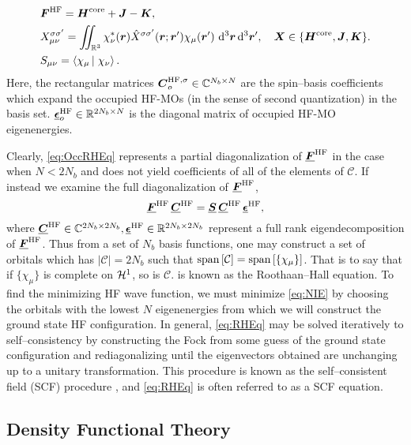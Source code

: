 \begin{subequations}
\begin{align}
  &\boldsymbol{F}^{\mathrm{HF}}=  \boldsymbol{H}^{\mathrm{core}} + \boldsymbol{J} - \boldsymbol{K}, \label{eq:HFMat}\\ 
&X_{\mu\nu}^{\sigma\sigma'} =  \int\mkern-12mu\int_{\mathbb R^3} \chi^*_\nu(\boldsymbol{r}) \hat{X}^{\sigma\sigma'}(\boldsymbol{r}; \boldsymbol{r}') \chi_\mu(\boldsymbol{r}')\,\,\mathrm{d}^3\boldsymbol{r}\,\mathrm{d}^3\boldsymbol{r}',
\quad \boldsymbol{X} \in \{ \boldsymbol{H}^{\mathrm{core}} , \boldsymbol{J} , \boldsymbol{K} \}. \label{eq:OBBasisExp}\\
&S_{\mu\nu} = \left\langle \chi_\mu \left\vert\right. \chi_\nu \right\rangle. 
\end{align}
\end{subequations}
Here, the rectangular matrices $\boldsymbol{C}_o^{\mathrm{HF},\sigma} \in \mathbb{C}^{N_b \times N}$
are the spin--basis coefficients which expand the occupied HF-MOs (in the sense
of second quantization) in the basis set. $\boldsymbol{\underline{\epsilon}}_o^{\mathrm{HF}} \in
\mathbb{R}^{2N_b \times N}$ is the diagonal matrix of occupied HF-MO eigenenergies. 

Clearly, \cref{eq:OccRHEq} represents a partial diagonalization of $\boldsymbol{\underline{F}}^{\mathrm{HF}}$ in the case when $N < 2N_b$ and does not
yield coefficients of all of the elements of $\mathcal{C}$. If instead we examine the full diagonalization of $\boldsymbol{\underline{F}}^{\mathrm{HF}}$,
\begin{equation}
\label{eq:RHEq}
\boldsymbol{\underline{F}}^{\mathrm{HF}} \,\boldsymbol{\underline{C}}^{\mathrm{HF}} = \boldsymbol{\underline{S}}\, \boldsymbol{\underline{C}}^{\mathrm{HF}}\, \boldsymbol{\underline{\epsilon}}^{\mathrm{HF}},
\end{equation}
where $\boldsymbol{\underline{C}}^{\mathrm{HF}} \in \mathbb{C}^{2N_b \times 2N_b}, \boldsymbol{\underline{\epsilon}}^{\mathrm{HF}} \in \mathbb{R}^{2N_b \times 2N_b}$ represent a full rank 
eigendecomposition of $\boldsymbol{\underline{F}}^{\mathrm{HF}}$. Thus from a set of $N_b$ basis functions, one may construct a set of orbitals
which has $\vert \mathcal{C} \vert = 2N_b$ such that $\mathrm{span}\left[ \mathcal{C} \right] = \mathrm{span}\left[ \{\chi_\mu\} \right]$. That is to say that if $\{\chi_\mu\}$
is complete on $\mathcal{H}^1$, so is $\mathcal{C}$.  is known as the Roothaan--Hall equation.
To find the minimizing HF wave function, we must minimize \cref{eq:NIE}
by choosing the orbitals with the lowest $N$ eigenenergies from which we will construct the ground state HF configuration.
In general, \cref{eq:RHEq} may be solved iteratively to self--consistency by constructing the Fock from some guess
of the ground
state configuration and rediagonalizing until the eigenvectors obtained are unchanging up to a unitary transformation.
This procedure is known as the self--consistent field (SCF) procedure \cite{Ostlund12_book}, and \cref{eq:RHEq} is
often referred to as a SCF equation.

\subsection{Density Functional Theory}
\label{sec:DFT}

